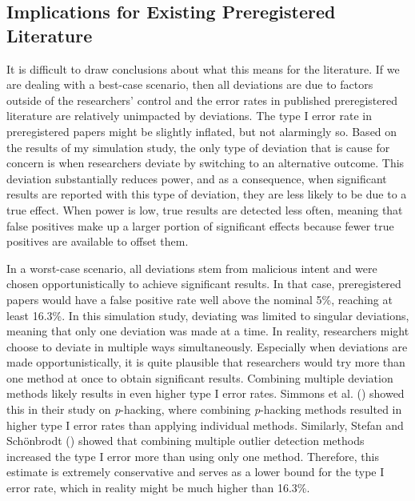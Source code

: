 \documentclass[
  man,
  floatsintext,
  longtable,
  nolmodern,
  notxfonts,
  notimes,
  colorlinks=true,linkcolor=blue,citecolor=blue,urlcolor=blue]{apa7}
\begin{document}
\subsection{Implications for Existing Preregistered
Literature}\label{implications-for-existing-preregistered-literature}

It is difficult to draw conclusions about what this means for the
literature. If we are dealing with a best-case scenario, then all
deviations are due to factors outside of the researchers' control and
the error rates in published preregistered literature are relatively
unimpacted by deviations. The type I error rate in preregistered papers
might be slightly inflated, but not alarmingly so. Based on the results
of my simulation study, the only type of deviation that is cause for
concern is when researchers deviate by switching to an alternative
outcome. This deviation substantially reduces power, and as a
consequence, when significant results are reported with this type of
deviation, they are less likely to be due to a true effect. When power
is low, true results are detected less often, meaning that false
positives make up a larger portion of significant effects because fewer
true positives are available to offset them.

In a worst-case scenario, all deviations stem from malicious intent and
were chosen opportunistically to achieve significant results. In that
case, preregistered papers would have a false positive rate well above
the nominal 5\%, reaching at least 16.3\%. In this simulation study,
deviating was limited to singular deviations, meaning that only one
deviation was made at a time. In reality, researchers might choose to
deviate in multiple ways simultaneously. Especially when deviations are
made opportunistically, it is quite plausible that researchers would try
more than one method at once to obtain significant results. Combining
multiple deviation methods likely results in even higher type I error
rates. Simmons et al. () showed this in
their study on \emph{p}-hacking, where combining \emph{p}-hacking
methods resulted in higher type I error rates than applying individual
methods. Similarly, Stefan and Schönbrodt
() showed that combining multiple outlier
detection methods increased the type I error more than using only one
method. Therefore, this estimate is extremely conservative and serves as
a lower bound for the type I error rate, which in reality might be much
higher than 16.3\%.
\end{document}
